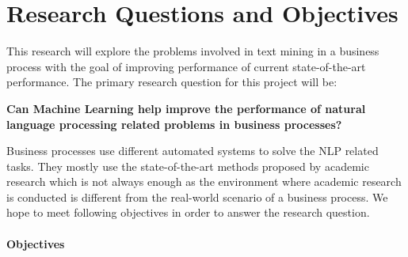 \section{Research Questions and Objectives}\label{sec:rq}
This research will explore the problems involved in text mining in a business process with the goal of improving performance of current state-of-the-art performance. The primary research question for this project will be:

\vspace{12pt}

\noindent \textbf{Can Machine Learning help improve the performance of natural language processing related problems in business processes?}

\vspace{12pt}
Business processes use different automated systems to solve the NLP related tasks. They mostly use the state-of-the-art methods proposed by academic research which is not always enough as the environment where academic research is conducted is different from the real-world scenario of a business process. We hope to meet following objectives in order to answer the research question.

\paragraph{Objectives}\label{sec:objectives}

